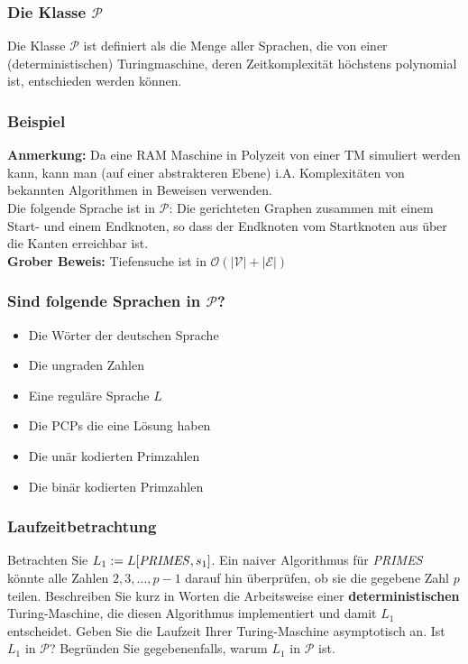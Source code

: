 \documentclass{beamer}
\begin{document}
\begin{frame}
\frametitle{Die Klasse $\mathcal{P}$}
Die Klasse $\mathcal{P}$ ist definiert als die Menge aller Sprachen, die von einer (deterministischen) Turingmaschine, deren Zeitkomplexität höchstens polynomial ist, entschieden werden können.\\[6pt]
\end{frame}

\begin{frame}
\frametitle{Beispiel}
\textbf{Anmerkung:} Da eine RAM Maschine in Polyzeit von einer TM simuliert werden kann, kann man (auf einer abstrakteren Ebene) i.A. Komplexitäten von bekannten Algorithmen in Beweisen verwenden.\\[10pt]
Die folgende Sprache ist in $\mathcal{P}$: Die gerichteten Graphen zusammen mit einem Start- und einem Endknoten, so dass der Endknoten vom Startknoten aus über die Kanten erreichbar ist.\\[6pt]
\textbf{Grober Beweis:}	Tiefensuche ist in $\mathcal{O}(|\mathcal{V}| + |\mathcal{E}|)$
\end{frame}

\begin{frame}
\frametitle{Sind folgende Sprachen in $\mathcal{P}$?}
\begin{itemize}
\item Die Wörter der deutschen Sprache
\item Die ungraden Zahlen
\item Eine reguläre Sprache $L$
\item Die PCPs die eine Lösung haben
\item Die unär kodierten Primzahlen
\item Die binär kodierten Primzahlen
\end{itemize}
\end{frame}

\begin{frame}
 \frametitle{Laufzeitbetrachtung}
 Betrachten Sie $L_1 := L[\text{\textit{PRIMES}},s_1]$. 
Ein naiver Algorithmus für \textit{PRIMES} könnte alle Zahlen $2,3,\ldots,p-1$ darauf hin überprüfen, ob sie die gegebene Zahl $p$ teilen. 
Beschreiben Sie kurz in Worten die Arbeitsweise einer \textbf{deterministischen} Turing-Maschine, die diesen Algorithmus implementiert und damit $L_1$ entscheidet. 
Geben Sie die Laufzeit Ihrer Turing-Maschine asymptotisch an. Ist $L_1$ in $\mathcal{P}$? Begründen Sie gegebenenfalls, warum $L_1$ in $\mathcal{P}$ ist.
\end{frame}
\end{document}
